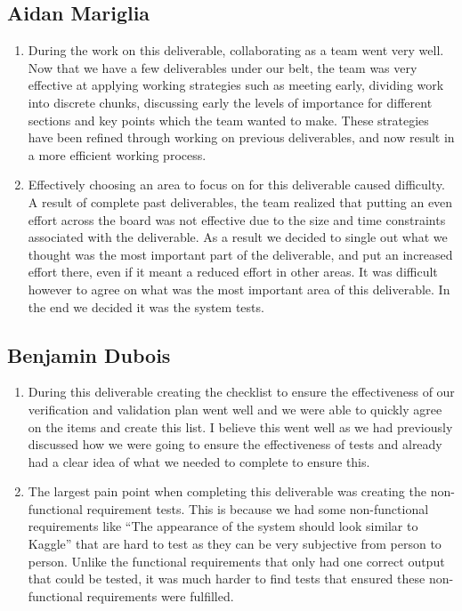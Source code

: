 \documentclass[12pt, titlepage]{article}
\begin{document}
\subsection*{Aidan Mariglia}

\begin{enumerate}
    \item During the work on this deliverable, collaborating as a team went very well. Now that we have a few deliverables under our belt, the team was very effective at applying working strategies such as meeting early, dividing work into discrete chunks, discussing early the levels of importance for different sections and key points which the team wanted to make. These strategies have been refined through working on previous deliverables, and now result in a more efficient working process.
    \item Effectively choosing an area to focus on for this deliverable caused difficulty. A result of complete past deliverables, the team realized that putting an even effort across the board was not effective due to the size and time constraints associated with the deliverable. As a result we decided to single out what we thought was the most important part of the deliverable, and put an increased effort there, even if it meant a reduced effort in other areas. It was difficult however to agree on what was the most important area of this deliverable. In the end we decided it was the system tests.

\end{enumerate}  

\subsection*{Benjamin Dubois}

\begin{enumerate}
    \item During this deliverable creating the checklist to ensure the effectiveness of our verification and validation plan went well and we were able to quickly agree on the items and create this list. I believe this went well as we had previously discussed how we were going to ensure the effectiveness of tests and already had a clear idea of what we needed to complete to ensure this. 
    \item The largest pain point when completing this deliverable was creating the non-functional requirement tests. This is because we had some non-functional requirements like “The appearance of the system should look similar to Kaggle” that are hard to test as they can be very subjective from person to person. Unlike the functional requirements that only had one correct output that could be tested, it was much harder to find tests that ensured these non-functional requirements were fulfilled. 
\end{enumerate}  
\end{document}
